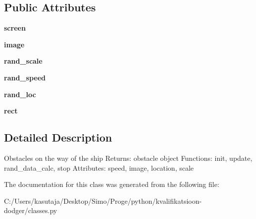 \subsection*{Public Attributes}
\begin{DoxyCompactItemize}
\item 
\hypertarget{classclasses_1_1obstacle_afb097093e25efbe66b816fbfe8e595a3}{}{\bfseries screen}\label{classclasses_1_1obstacle_afb097093e25efbe66b816fbfe8e595a3}

\item 
\hypertarget{classclasses_1_1obstacle_ad57e5c1104ac75b5117d5a4cbb4c8707}{}{\bfseries image}\label{classclasses_1_1obstacle_ad57e5c1104ac75b5117d5a4cbb4c8707}

\item 
\hypertarget{classclasses_1_1obstacle_a2ed6dce87e174487e5c3e10ef7dff7aa}{}{\bfseries rand\+\_\+scale}\label{classclasses_1_1obstacle_a2ed6dce87e174487e5c3e10ef7dff7aa}

\item 
\hypertarget{classclasses_1_1obstacle_a53ca65f2c8f91c55679dce75bf6fec3b}{}{\bfseries rand\+\_\+speed}\label{classclasses_1_1obstacle_a53ca65f2c8f91c55679dce75bf6fec3b}

\item 
\hypertarget{classclasses_1_1obstacle_a5f8bdd4f404148f9a19e416fb8d2c1d6}{}{\bfseries rand\+\_\+loc}\label{classclasses_1_1obstacle_a5f8bdd4f404148f9a19e416fb8d2c1d6}

\item 
\hypertarget{classclasses_1_1obstacle_ab67a18a8d5e47419be009b51ba42b9aa}{}{\bfseries rect}\label{classclasses_1_1obstacle_ab67a18a8d5e47419be009b51ba42b9aa}

\end{DoxyCompactItemize}


\subsection{Detailed Description}
\begin{DoxyVerb}Obstacles on the way of the ship
Returns: obstacle object
Functions: init, update, rand_data_calc, stop
Attributes: speed, image, location, scale\end{DoxyVerb}
 

The documentation for this class was generated from the following file\+:\begin{DoxyCompactItemize}
\item 
C\+:/\+Users/kasutaja/\+Desktop/\+Simo/\+Proge/python/kvalifikatsioon-\/dodger/classes.\+py\end{DoxyCompactItemize}
